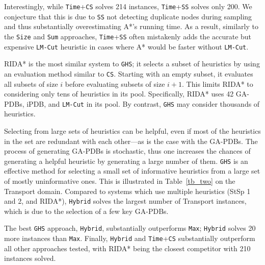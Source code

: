 Interestingly, while \texttt{Time}+\texttt{CS} solves 214 instances, \texttt{Time}+\texttt{SS} solves only 200. We conjecture that this is due to \texttt{SS} not detecting duplicate nodes during sampling and thus substantially overestimating A*'s running time. As a result, similarly to the \texttt{Size} and \texttt{Sum} approaches, \texttt{Time}+\texttt{SS} often mistakenly adds the accurate but expensive \texttt{LM-Cut} heuristic in cases where A*  would be faster without \texttt{LM-Cut}. %

RIDA* is the most similar system to \texttt{GHS}; it selects a subset of heuristics by using an evaluation method similar to \texttt{CS}. %
Starting with an empty subset, it evaluates all subsets of size $i$ before evaluating subsets of size $i+1$. This limits RIDA* to considering only tens of heuristics in its pool. Specifically, RIDA* uses 42 GA-PDBs, iPDB, and \texttt{LM-Cut} in its pool. By contrast, \texttt{GHS} may consider thousands of heuristics. %
%

Selecting from large sets of heuristics can be helpful, %
even if most of the heuristics in the set are redundant with each other---as is the case with the GA-PDBs. The process of generating GA-PDBs is stochastic, thus one increases the chances of generating a helpful heuristic by generating a large number of them. \texttt{GHS} is an effective method for selecting a small set of informative heuristics from a large set of mostly uninformative ones. This is illustrated in Table~\ref{tb_two} on the Transport domain. Compared to systems which use multiple heuristics (StSp 1 and 2, and RIDA*), \texttt{Hybrid} solves the largest number of Transport instances, which is due to the selection of a few key GA-PDBs.

The best \texttt{GHS} approach, \texttt{Hybrid}, substantially outperforms  \texttt{Max}; \texttt{Hybrid} solves 20 more instances than \texttt{Max}. Finally, \texttt{Hybrid} and \texttt{Time}+\texttt{CS} substantially outperform all other approaches tested, with RIDA* being the closest competitor with 210 instances solved. 


